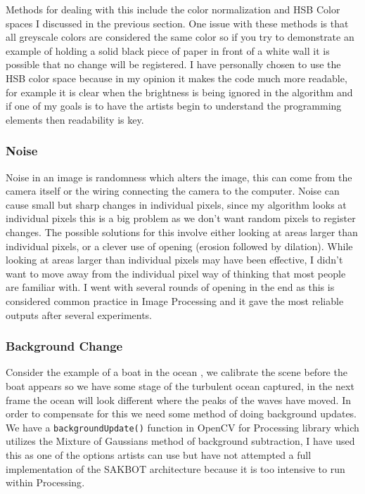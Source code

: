 \documentclass[a4paper]{report}
\begin{document}
Methods for dealing with this include the color normalization and HSB Color spaces I discussed in the previous section. One issue with these methods is that all greyscale colors are considered the same color so if you try to demonstrate an example of holding a solid black piece of paper in front of a white wall it is possible that no change will be registered. I have personally chosen to use the HSB color space because in my opinion it makes the code much more readable, for example it is clear when the brightness is being ignored in the algorithm and if one of my goals is to have the artists begin to understand the programming elements then readability is key.

\subsubsection{Noise}
Noise in an image is randomness which alters the image, this can come from the camera itself or the wiring connecting the camera to the computer. Noise can cause small but sharp changes in individual pixels, since my algorithm looks at individual pixels this is a big problem as we don't want random pixels to register changes. The possible solutions for this involve either looking at areas larger than individual pixels, or a clever use of opening (erosion followed by dilation). While looking at areas larger than individual pixels may have been effective, I didn't want to move away from the individual pixel way of thinking that most people are familiar with. I went with several rounds of opening in the end as this is considered common practice in Image Processing and it gave the most reliable outputs after several experiments.

\subsubsection{Background Change}
Consider the example of a boat in the ocean , we calibrate the scene before the boat appears so we have some stage of the turbulent ocean captured, in the next frame the ocean will look different where the peaks of the waves have moved. In order to compensate for this we need some method of doing background updates. We have a \verb|backgroundUpdate()| function in OpenCV for Processing library\cite{OPENCV} which utilizes the Mixture of Gaussians method of background subtraction, I have used this as one of the options artists can use but have not attempted a full implementation of the SAKBOT architecture\cite{SAKBOT} because it is too intensive to run within Processing\cite{PROCESSING}.
\end{document}
